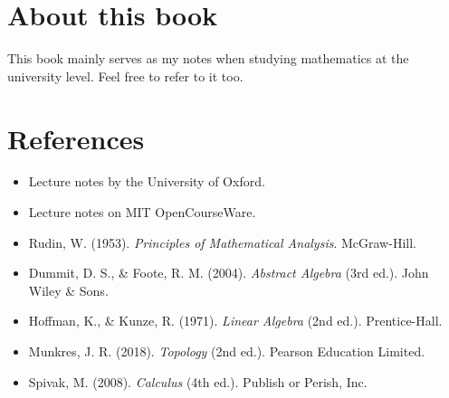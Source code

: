 \documentclass[10pt,a4 paper]{extreport}
\begin{document}
\section*{About this book}
This book mainly serves as my notes when studying mathematics at the university level. Feel free to refer to it too.

\section*{References}
\begin{itemize}
\item Lecture notes by the University of Oxford.
\item Lecture notes on MIT OpenCourseWare.
\item Rudin, W. (1953). \textit{Principles of Mathematical Analysis}. McGraw-Hill.
\item Dummit, D. S., \& Foote, R. M. (2004). \textit{Abstract Algebra} (3rd ed.). John Wiley \& Sons.
\item Hoffman, K., \& Kunze, R. (1971). \textit{Linear Algebra} (2nd ed.). Prentice-Hall.
\item Munkres, J. R. (2018). \textit{Topology} (2nd ed.). Pearson Education Limited.
\item Spivak, M. (2008). \textit{Calculus} (4th ed.). Publish or Perish, Inc.
\end{itemize}
\pagebreak
\end{document}
